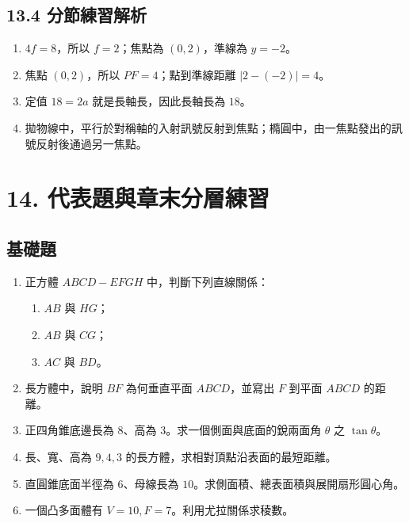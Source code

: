 \documentclass[11pt,a4paper]{article}
\providecommand{\tightlist}{%
  \setlength{\itemsep}{0pt}\setlength{\parskip}{0pt}}
\begin{document}
\subsection{13.4 分節練習解析}\label{ux5206ux7bc0ux7df4ux7fd2ux89e3ux6790-12}

\begin{enumerate}
\def\labelenumi{\arabic{enumi}.}
\tightlist
\item
  \(4f=8\)，所以 \(f=2\)；焦點為 \((0,2)\)，準線為 \(y=-2\)。
\item
  焦點 \((0,2)\)，所以 \(PF=4\)；點到準線距離 \(|2-(-2)|=4\)。
\item
  定值 \(18=2a\) 就是長軸長，因此長軸長為 \(18\)。
\item
  拋物線中，平行於對稱軸的入射訊號反射到焦點；橢圓中，由一焦點發出的訊號反射後通過另一焦點。
\end{enumerate}

\section{14. 代表題與章末分層練習}\label{ux4ee3ux8868ux984cux8207ux7ae0ux672bux5206ux5c64ux7df4ux7fd2}

\subsection{基礎題}\label{ux57faux790eux984c}

\begin{enumerate}
\def\labelenumi{\arabic{enumi}.}
\item
  正方體 \(ABCD-EFGH\) 中，判斷下列直線關係：

  \begin{enumerate}
  \def\labelenumii{\arabic{enumii}.}
  \tightlist
  \item
    \(AB\) 與 \(HG\)；
  \item
    \(AB\) 與 \(CG\)；
  \item
    \(AC\) 與 \(BD\)。
  \end{enumerate}
\item
  長方體中，說明 \(BF\) 為何垂直平面 \(ABCD\)，並寫出 \(F\) 到平面 \(ABCD\) 的距離。
\item
  正四角錐底邊長為 \(8\)、高為 \(3\)。求一個側面與底面的銳兩面角 \(\theta\) 之 \(\tan\theta\)。
\item
  長、寬、高為 \(9,4,3\) 的長方體，求相對頂點沿表面的最短距離。
\item
  直圓錐底面半徑為 \(6\)、母線長為 \(10\)。求側面積、總表面積與展開扇形圓心角。
\item
  一個凸多面體有 \(V=10,F=7\)。利用尤拉關係求稜數。
\end{enumerate}
\end{document}
